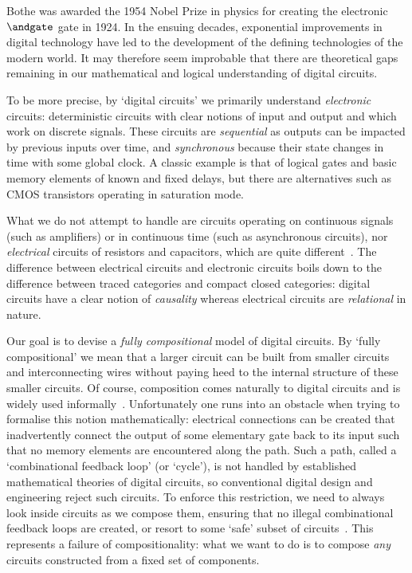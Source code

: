 \documentclass{lmcs}
\begin{document}
Bothe was awarded the 1954 Nobel Prize in physics for creating the electronic
\(\andgate\) gate in 1924.
In the ensuing decades, exponential improvements in digital technology have led
to the development of the defining technologies of the modern world.
It may therefore seem improbable that there are theoretical gaps remaining in
our mathematical and logical understanding of digital circuits.

To be more precise, by `digital circuits' we primarily understand
\emph{electronic} circuits: deterministic circuits with clear notions of
input and output and which work on discrete signals.
These circuits are \emph{sequential} as outputs can be impacted by previous
inputs over time, and \emph{synchronous} because their state changes in time
with some global clock.
A classic example is that of logical gates and basic memory elements of known
and fixed delays, but there are alternatives such as CMOS transistors operating
in saturation mode.

What we do not attempt to handle are circuits operating on continuous signals
(such as amplifiers) or in continuous time (such as asynchronous circuits), nor
\emph{electrical} circuits of resistors and capacitors, which are quite
different~\cite{boisseau2022string}.
The difference between electrical circuits and electronic circuits boils down to
the difference between traced categories and compact closed categories: digital
circuits have a clear notion of \emph{causality} whereas electrical circuits are
\emph{relational} in nature.

Our goal is to devise a \emph{fully compositional} model of digital circuits.
By `fully compositional' we mean that a larger circuit can be built from smaller
circuits and interconnecting wires without paying heed to the internal structure
of these smaller circuits.
Of course, composition comes naturally to digital circuits and is widely used
informally~\cite{gordon1982model}.
Unfortunately one runs into an obstacle when trying to formalise this notion
mathematically: electrical connections can be created that inadvertently
connect the output of some elementary gate back to
its input such that no memory elements are encountered along the path.
Such a path, called a `combinational feedback loop' (or `cycle'), is not handled
by established mathematical theories of digital circuits, so conventional
digital design and engineering reject such circuits.
To enforce this restriction, we need to always look inside circuits as we
compose them, ensuring that no illegal combinational feedback loops are created,
or resort to some `safe' subset of circuits~\cite{christensen2021wire}.
This represents a failure of compositionality: what we want to do is to compose
\emph{any} circuits constructed from a fixed set of components.
\end{document}
